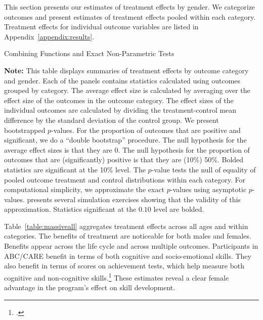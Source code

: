 This section presents our estimates of treatment effects by gender. We categorize outcomes and present estimates of treatment effects pooled within each category. Treatment effects for individual outcome variables are listed in Appendix~\ref{appendix:results}.

\begin{table}[!htpb]
\begin{threeparttable}
\caption{Combining Functions and Exact Non-Parametric Tests} \label{table:massiveall}
\centering

\begin{tablenotes}
\scriptsize
\item \textbf{Note:} This table displays summaries of treatment effects by outcome category and gender. Each of the panels contains statistics calculated using outcomes grouped by category. The average effect size is calculated by averaging over the effect size of the outcomes in the outcome category. The effect sizes of the individual outcomes are calculated by dividing the treatment-control mean difference by the standard deviation of the control group. We present bootstrapped $p$-values. For the proportion of outcomes that are positive and significant, we do a ``double bootstrap'' procedure. The null hypothesis for the average effect sizes is that they are 0. The null hypothesis for the proportion of outcomes that are (significantly) positive is that they are (10\%) 50\%. Bolded statistics are significant at the 10\% level. The \citet{Rosenbaum_2005_Distribution_JRSS} $p$-value tests the null of equality of pooled outcome treatment and control distributions within each category. For computational simplicity, we approximate the exact $p$-values using asymptotic $p$-values. \citet{Rosenbaum_2005_Distribution_JRSS} presents several simulation exercises showing that the validity of this approximation. Statistics significant at the $0.10$ level are bolded.
\end{tablenotes}
\end{threeparttable}
\end{table}

Table~\ref{table:massiveall} aggregates treatment effects across all ages and within categories. The benefits of treatment are noticeable for both males and females. Benefits appear across the life cycle and across multiple outcomes. Participants in ABC/CARE benefit in terms of both cognitive and socio-emotional skills. They also benefit in terms of scores on achievement tests, which help measure both cognitive and non-cognitive skills.\footnote{\citet{Almlund_Duckworth_etal_2011_ecoval}.} These estimates reveal a clear female advantage in the program's effect on skill development.

